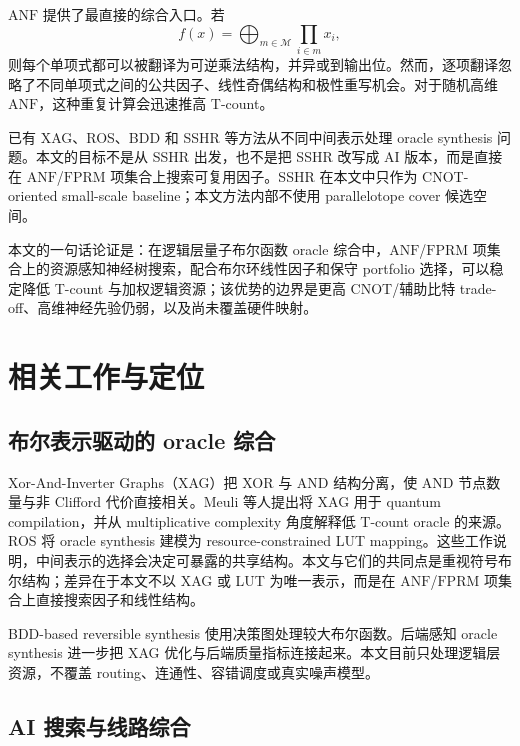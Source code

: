 \documentclass[UTF8,fontset=macnew,11pt]{ctexart}
\newcommand{\anf}{\ensuremath{\mathrm{ANF}}}
\newcommand{\fprm}{\ensuremath{\mathrm{FPRM}}}
\begin{document}
\anf{} 提供了最直接的综合入口。若
\begin{equation}
  f(x)=\bigoplus_{m\in\mathcal{M}}\prod_{i\in m}x_i ,
  \label{eq:anf}
\end{equation}
则每个单项式都可以被翻译为可逆乘法结构，并异或到输出位。然而，逐项翻译忽略了不同单项式之间的公共因子、线性奇偶结构和极性重写机会。对于随机高维 \anf{}，这种重复计算会迅速推高 T-count。

已有 XAG、ROS、BDD 和 SSHR 等方法从不同中间表示处理 oracle synthesis 问题\cite{meuli2022xag,meuli2020ros,wille2009bdd,zheng2025sshr}。本文的目标不是从 SSHR 出发，也不是把 SSHR 改写成 AI 版本，而是直接在 \anf{}/\fprm{} 项集合上搜索可复用因子。SSHR 在本文中只作为 CNOT-oriented small-scale baseline；本文方法内部不使用 parallelotope cover 候选空间。

本文的一句话论证是：在逻辑层量子布尔函数 oracle 综合中，\anf{}/\fprm{} 项集合上的资源感知神经树搜索，配合布尔环线性因子和保守 portfolio 选择，可以稳定降低 T-count 与加权逻辑资源；该优势的边界是更高 CNOT/辅助比特 trade-off、高维神经先验仍弱，以及尚未覆盖硬件映射。

\section{相关工作与定位}

\subsection{布尔表示驱动的 oracle 综合}

Xor-And-Inverter Graphs（XAG）把 XOR 与 AND 结构分离，使 AND 节点数量与非 Clifford 代价直接相关。Meuli 等人提出将 XAG 用于 quantum compilation\cite{meuli2022xag}，并从 multiplicative complexity 角度解释低 T-count oracle 的来源\cite{meuli2019multiplicative}。ROS 将 oracle synthesis 建模为 resource-constrained LUT mapping\cite{meuli2020ros}。这些工作说明，中间表示的选择会决定可暴露的共享结构。本文与它们的共同点是重视符号布尔结构；差异在于本文不以 XAG 或 LUT 为唯一表示，而是在 \anf{}/\fprm{} 项集合上直接搜索因子和线性结构。

BDD-based reversible synthesis 使用决策图处理较大布尔函数\cite{wille2009bdd}。后端感知 oracle synthesis 进一步把 XAG 优化与后端质量指标连接起来\cite{yu2025backend}。本文目前只处理逻辑层资源，不覆盖 routing、连通性、容错调度或真实噪声模型。

\subsection{AI 搜索与线路综合}
\end{document}
